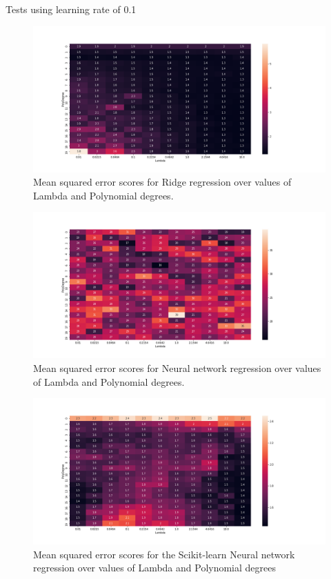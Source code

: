 \documentclass[reprint,english,notitlepage]{revtex4-2}  %
\begin{document}
Tests using learning rate of 0.1 
\begin{figure}[!htb]
	\centering\includegraphics[trim=75 20 0 0, scale=0.3]{Partb-3}
	\caption{Mean squared error scores for Ridge regression over values of Lambda and Polynomial degrees. }\label{figure}
\end{figure}
\begin{figure}[!htb]
	\centering\includegraphics[trim=75 20 0 0, scale=0.3]{Partb-4}
	\caption{Mean squared error scores for Neural network regression over values of Lambda and Polynomial degrees.}\label{figure}
\end{figure}
\begin{figure}[!htb]
	\centering\includegraphics[trim=75 20 0 200, scale=0.3]{Partb-5}
	\caption{Mean squared error scores for the Scikit-learn Neural network regression over values of Lambda and Polynomial degrees}\label{figure}
\end{figure}
\end{document}
